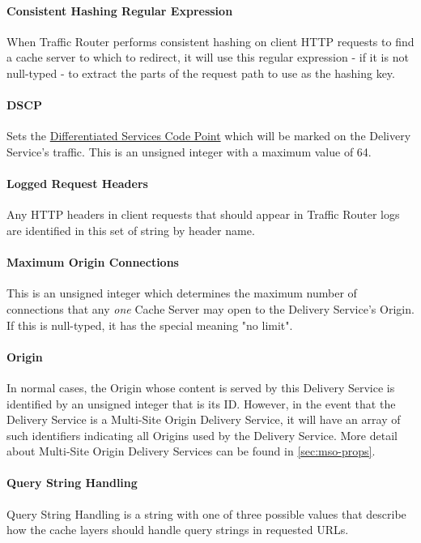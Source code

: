 \paragraph{Consistent Hashing Regular Expression}
When Traffic Router performs consistent hashing on client HTTP requests to find
a cache server to which to redirect, it will use this regular expression - if it
is not null-typed - to extract the parts of the request path to use as the
hashing key.

\paragraph{DSCP}
Sets the
\href{https://tools.ietf.org/html/rfc2474}{Differentiated Services Code Point}
which will be marked on the Delivery Service's traffic. This is an unsigned
integer with a maximum value of 64.

\paragraph{Logged Request Headers}
Any HTTP headers in client requests that should appear in Traffic Router logs
are identified in this set of string by header name.

\paragraph{Maximum Origin Connections}
This is an unsigned integer which determines the maximum number of connections
that any \emph{one} Cache Server may open to the Delivery Service's Origin.\\
If this is null-typed, it has the special meaning "no limit".

\paragraph{Origin}
In normal cases, the Origin whose content is served by this Delivery Service is
identified by an unsigned integer that is its ID. However, in the event that
the Delivery Service is a Multi-Site Origin Delivery Service, it will have an
array of such identifiers indicating all Origins used by the Delivery Service.
More detail about Multi-Site Origin Delivery Services can be found in
\ref{sec:mso-props}.

\paragraph{Query String Handling}
Query String Handling is a string with one of three possible values that
describe how the cache layers should handle query strings in requested URLs.

